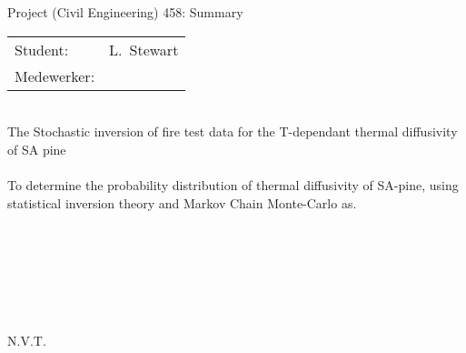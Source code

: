 
\begin{Summary}{Project (Civil Engineering) 458: Summary}

   \noindent
   \begin{tabular}{@{}ll@{}}
      \textsf{Student:}    &  L.\ Stewart\\
      \textsf{Medewerker:} &
   \end{tabular}

\begin{SumTable}
 \hline%
 \\
 \hline%
    The Stochastic inversion of fire test data for the 
    T-dependant thermal diffusivity of SA pine\\

 \hline%
 \\
 \hline%
    To determine the probability distribution of thermal diffusivity of SA-pine, using statistical inversion theory and Markov Chain Monte-Carlo as.\\

 \hline%
 \\
 \hline%
   \\

 \hline%
 \\
 \hline%
  \\

 \hline%
 \\
 \hline%
    
 \hline%
 \\
 \hline%
    N.V.T.\\


\end{SumTable}
\end{Summary}
